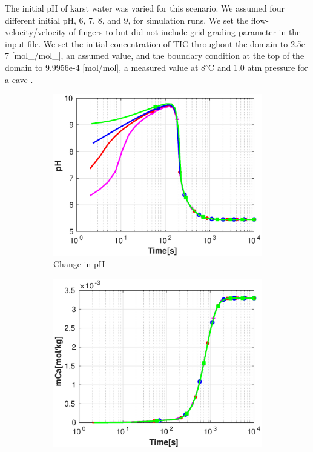 The initial pH of karst water was varied for this scenario. We assumed four different initial pH, 6, 7, 8, and 9, 
for simulation runs. We set the flow-velocity/velocity of  fingers to  but did not include grid grading 
parameter in the input file. We set the initial concentration of TIC throughout the domain to 2.5e-7 [mol\_/mol\_], 
an assumed value, and the boundary condition at the top of the domain to 9.9956e-4 [mol/mol], a measured value at 8$^{\circ}$C 
and 1.0 atm pressure for a cave \cite{Class2020}. \\

\begin{figure}[!h]
        \centering
    \begin{subfigure}{.5\linewidth}
            \centering
        \includegraphics[width=\textwidth]{PICTURES/with_pH_pH.eps}
        \caption{\small Change in pH}
        \label{fig:pHpH}
    \end{subfigure}%
        \hfill
    \begin{subfigure}{.5\linewidth}
            \centering
        \includegraphics[width=\textwidth]{PICTURES/with_pH_mCa.eps}

\end{subfigure}
\end{figure}
